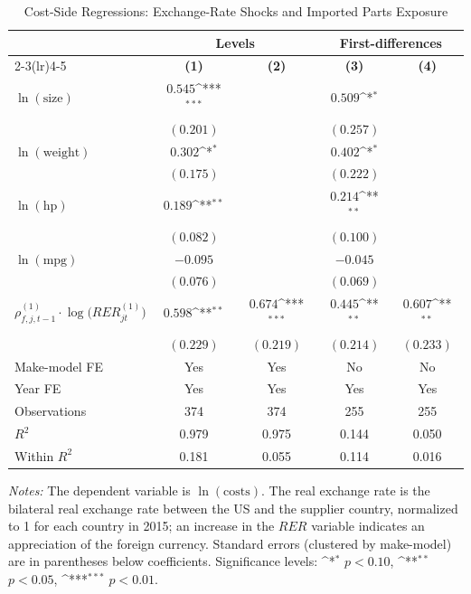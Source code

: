 \begin{table}[!htbp]
\centering
\begin{threeparttable}
\caption{Cost-Side Regressions: Exchange-Rate Shocks and Imported Parts Exposure}
\label{tab:cost_side_results}
\setlength{\tabcolsep}{5pt}
\renewcommand{\arraystretch}{1.12}
\newcommand{\sym}[1]{\ifmmode^{#1}\else\(^{#1}\)\fi}
\begin{tabular}{lcccc}
\toprule
 & \multicolumn{2}{c}{\textbf{Levels}} & \multicolumn{2}{c}{\textbf{First-differences}} \\
\cmidrule(lr){2-3}\cmidrule(lr){4-5}
 & \textbf{(1)} & \textbf{(2)} & \textbf{(3)} & \textbf{(4)} \\
\midrule
$\ln(\text{size})$
  & $0.545$\sym{***} &  & $0.509$\sym{*} &  \\
  & $(0.201)$ &  & $(0.257)$ &  \\
$\ln(\text{weight})$
  & $0.302$\sym{*} &  & $0.402$\sym{*} &  \\
  & $(0.175)$ &  & $(0.222)$ &  \\
$\ln(\text{hp})$
  & $0.189$\sym{**} &  & $0.214$\sym{**} &  \\
  & $(0.082)$ &  & $(0.100)$ &  \\
$\ln(\text{mpg})$
  & $-0.095$ &  & $-0.045$ &  \\
  & $(0.076)$ &  & $(0.069)$ &  \\
$\rho^{(1)}_{f,j,t-1}\cdot \log\!\big(RER^{(1)}_{jt}\big)$
  & $0.598$\sym{**} & $0.674$\sym{***} & $0.445$\sym{**} & $0.607$\sym{**} \\
  & $(0.229)$ & $(0.219)$ & $(0.214)$ & $(0.233)$ \\
\midrule
Make-model FE & Yes & Yes & No  & No  \\
Year FE       & Yes & Yes & Yes & Yes \\
\midrule
Observations  & 374 & 374 & 255 & 255 \\
$R^2$         & 0.979 & 0.975 & 0.144 & 0.050 \\
Within $R^2$  & 0.181 & 0.055 & 0.114 & 0.016 \\
\bottomrule
\end{tabular}
\begin{tablenotes}[flushleft]
\footnotesize
\item \textit{Notes:} The dependent variable is $\ln(\text{costs})$. The real exchange rate is the bilateral real exchange rate between the US and the supplier country, normalized to 1 for each country in 2015; an increase in the $RER$ variable indicates an appreciation of the foreign currency. Standard errors (clustered by make-model) are in parentheses below coefficients.
Significance levels: \sym{*} $p<0.10$, \sym{**} $p<0.05$, \sym{***} $p<0.01$.
\end{tablenotes}
\end{threeparttable}
\end{table}
